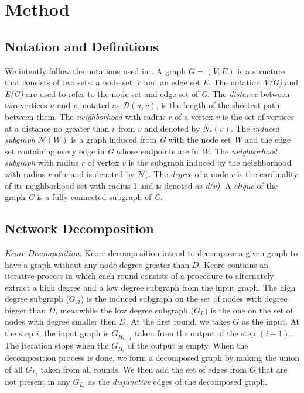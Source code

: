 \documentclass{esannV2}
\begin{document}
\section{Method}\label{method}

\subsection{Notation and Definitions}
We intently follow the notations used in \cite{nspdk}. A graph $G = (V,E)$ is a structure that consists of two sets: a node set \textit{V} and an edge set \textit{E}. The notation \textit{V(G)} and \textit{E(G)} are used to refer to the node set and edge set of \textit{G}. The \textit{distance} between two vertices $u$ and $v$, notated as $\mathcal{D}(u,v)$, is the length of the shortest path between them. The \textit{neighborhood} with radius $r$ of a vertex $v$ is the set of vertices at a distance no greater than $r$ from $v$ and denoted by $N_r(v)$. The \textit{induced subgraph} $\mathcal{N}(W)$ is a graph induced from \textit{G} with the node set \textit{W} and the edge set containing every edge in \textit{G} whose endpoints  are in \textit{W}. The \textit{neighborhood subgraph} with radius $r$ of vertex $v$ is the subgraph induced by the neighborhood with radius $r$ of $v$ and is denoted by $\mathcal{N}_{r}^{v}$. The \textit{degree} of a node \textit{v} is the cardinality of its neighborhood set with radius 1 and is denoted as \textit{d(v)}. A \textit{clique} of the graph \textit{G} is a fully connected subgraph of \textit{G}.

\subsection{Network Decomposition}
\textit{Kcore Decomposition}: Kcore decomposition intend to decompose a given graph to have a graph without any node degree greater than $D$. Kcore contains an iterative process in which each round consists of a procedure to alternately extract a high degree and a low degree subgraph from the input graph. The high degree subgraph ($G_H$) is the induced subgraph on the set of nodes with degree bigger than $D$, meanwhile the low degree subgraph ($G_L$) is the one on the set of nodes with degree smaller then $D$. At the first round, we takes $G$ as the input. At the step $i$, the input graph is $G_{H_{i-1}}$ taken from the output 
of the step $(i-1)$. The iteration stops when the $G_{H_{i}}$ of the output is empty. When the decomposition process is done, we form a decomposed graph by making the union of all $G_{L_{i}}$ taken from all rounds. We then add the set of edges from $G$ that are not present in any $G_{L_{i}}$ as the \textit{disjunctive} edges of the decomposed graph. 
\end{document}
